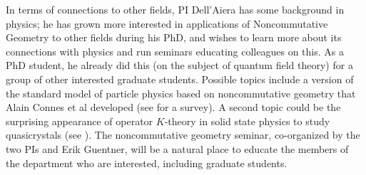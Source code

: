 \documentclass[11pt]{article}
\theoremstyle{plain}
\theoremstyle{definition}
\theoremstyle{remark}
\begin{document}

In terms of connections to other fields, PI Dell'Aiera has some background in physics; %
he has grown more interested in applications of Noncommutative Geometry to other fields during his PhD, and wishes to learn more about its connections with physics and run seminars educating colleagues on this.  As a PhD student, he already did this (on the subject of quantum field theory) for a group of other interested graduate students.  Possible topics include a version of the standard model of particle physics based on noncommutative geometry that  Alain Connes et al developed (see \cite{ChamseddineConnes} for a survey). A second topic could be the surprising appearance of operator $K$-theory in solid state physics to study quasicrystals (see \cite{Bellissard}).  The noncommutative geometry seminar, co-organized by the two PIs and Erik Guentner, will be a natural place to educate the members of the department who are interested, including graduate students.







 

\pagebreak



\end{document}
